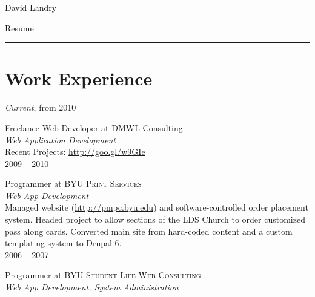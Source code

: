 \documentclass[10pt]{article}
\begin{document}
\color{text1} %

	\par{\centering
		{\sffamily\Huge David Landry
	}\\	
	{\color{headings} 
			{\Huge Resume}
		\\[25pt]\par}
	{\color{white} \hrule} %
	
\begin{minipage}[t]{0.5\textwidth} %

	\vspace{0pt}	%
	
\section{Work Experience}

	\raggedleft
	\emph{Current}, from \textsc{2010}\par

	\raggedright\large Freelance Web Developer at \href{http://dmwl.net}{DMWL Consulting} \\
	\emph{Web Application Development}\\[5pt]

  \normalsize{
  Recent Projects: \href{http://goo.gl/w9GIe}{http://goo.gl/w9GIe}
  }\\[10pt]

	\raggedleft
	\textsc{\normalsize 2009 -- 2010}\par

	\raggedright
	\large Programmer at \textsc{BYU Print Services}\\
  \emph{Web App Development}\\[5pt]

  \normalsize{
  Managed website (\href{http://pmpc.byu.edu}{http://pmpc.byu.edu}) and software-controlled order placement system.
  Headed project to allow sections of the LDS Church to order customized pass along cards. 
  Converted main site from hard-coded content and a custom templating system to Drupal 6.
  }\\[10pt]

	\raggedleft
	\textsc{\normalsize 2006 -- 2007}\par

	\raggedright\large Programmer at \textsc{BYU Student Life Web Consulting}\\
	\emph{Web App Development, System Administration}\\[5pt]


\end{minipage}}
\end{document}
